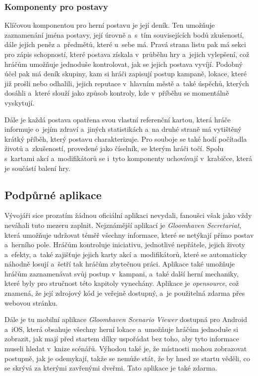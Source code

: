 \subsubsection*{Komponenty pro postavy}
\label{subsubsec:gh_comp_characters}

Klíčovou komponentou pro herní postavu je její deník. Ten umožňuje zaznamenání jména postavy, její úrovně a~s~tím souvisejících bodů zkušeností, dále jejích peněz a~předmětů, které u~sebe má. Pravá strana listu pak má sekci pro zápis schopností, které postava získala v~průběhu hry a~jejich vylepšení, což hráčům umožňuje jednoduše kontrolovat, jak se jejich postava vyvíjí. Podobný účel pak má deník skupiny, kam si hráči zapisují postup kampaně, lokace, které již prošli nebo odhalili, jejich reputace v~hlavním městě a~také úspěchů, kterých dosáhli a~které slouží jako způsob kontroly, kde v~příběhu se momentálně vyskytují.

Dále je každá postava opatřena svou vlastní referenční kartou, která hráče informuje o~jejím zdraví a~jiných statistikách a~na druhé straně má vytištěný krátký příběh, který postavu charakterizuje. Pro souboje se také hodí počítadla životů a~zkušeností, provedené jako číselník, se kterým hráči točí. Spolu s~kartami akcí a~modifikátorů se i~tyto komponenty uchovávají v~krabičce, která je součástí balení hry.

\subsection{Podpůrné aplikace}
\label{subsec:gh_apps}

Vývojáři sice prozatím žádnou oficiální aplikaci nevydali, fanoušci však jako vždy neváhali tuto mezeru zaplnit. Nejznámější aplikací je \textit{Gloomhaven Secretariat}, která umožňuje udržovat téměř všechny informace, které se netýkají přímo postav a~herního pole. Hráčům kontroluje iniciativu, jednotlivé nepřátele, jejich životy a~efekty, a~také zajišťuje jejich karty akcí a~modifikátorů, které se automaticky náhodně losují a~šetří tak hráčům zbytečnou práci. Aplikace také umožňuje hráčům zaznamenávat svůj postup v~kampani, a~také další herní mechaniky, které byly pro stručnost této kapitoly vynechány. Aplikace je \textit{opensource}, což znamená, že její zdrojový kód je veřejně dostupný, a~je použitelná zdarma přes webovou stránku. \cite{gloomhaven_secretariat}

Dále je tu mobilní aplikace \textit{Gloomhaven Scenario Viewer} dostupná pro Android a~iOS, která obsahuje všechny herní lokace a~umožňuje hráčům jednoduše si zobrazit, jak mají před startem dílky uspořádat bez toho, aby tyto informace museli hledat v~knize scénářů. Výhodou také je, že místnosti mohou zobrazovat postupně, jak je odemykají, takže se nemůže stát, že by hned ze startu věděli, co se skrývá za kterými zavřenými dveřmi. Tato aplikace je také zdarma.

